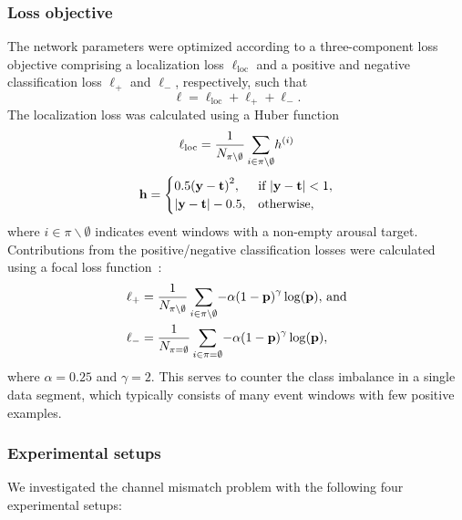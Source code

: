 \subsubsection{Loss objective}
The network parameters were optimized according to a three-component loss objective comprising a localization loss \( \ell_{\mathrm{loc}} \) and a positive and negative classification loss $\ell_{+}$ and $\ell_{-}$, respectively, such that
\begin{equation}\label{eq:paperv-loss}
    \ell = \ell_{\mathrm{loc}} + \ell_{+} + \ell_{-}.
\end{equation}
The localization loss was calculated using a Huber function
\begin{equation}
    \ell_{\mathrm{loc}} = \frac{1}{N_{\pi \backslash \emptyset}} \sum_{i \in \pi \backslash \emptyset}\!{h^{(i)}} \\
\end{equation} 
\begin{equation}
    \mathbf{h} =
    \begin{cases}
        0.5 \parentheses*{ \mathbf{y} - \mathbf{t} }^2, & \text{if } \abs*{ \mathbf{y} - \mathbf{t}  } < 1, \\
        \abs*{ \mathbf{y} - \mathbf{t} } - 0.5, & \text{otherwise,}
    \end{cases}
\end{equation}
where $i \in \pi \backslash \emptyset$ indicates event windows with a non-empty arousal target.
Contributions from the positive/negative classification losses were calculated using a focal loss function~\cite{Lin2020}:
\begin{align}
    \ell_{+} &= \frac{1}{N_{\pi \backslash \emptyset}} \sum_{i \in \pi \backslash \emptyset}\!{-\alpha \parentheses*{ 1 - \mathbf{p} }^{\gamma}\func{\log}{\mathbf{p} }}, \, \text{and} \\
    \ell_{-} &= \frac{1}{N_{\pi = \emptyset}} \sum_{i \in \pi = \emptyset}\!{-\alpha \parentheses*{ 1 - \mathbf{p} }^{\gamma}\func{\log}{\mathbf{p}}},
\end{align}
where $\alpha=0.25$ and $\gamma=2$.
This serves to counter the class imbalance in a single data segment, which typically consists of many event windows with few positive examples.

\subsubsection{Experimental setups}
We investigated the channel mismatch problem with the following four experimental setups:

